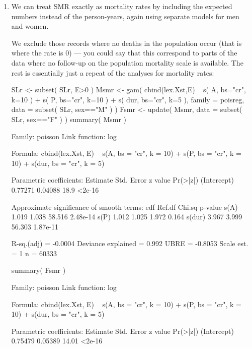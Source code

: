 \begin{enumerate}[resume]

  
  

\item We can treat SMR exactly as mortality rates by including the
  expected numbers instead of the person-years, again using separate
  models for men and women.
 
  We exclude those records where no deaths in the population occur
  (that is where the rate is 0) --- you could say that this correspond
  to parts of the data where no follow-up on the population mortality
  scale is available. The rest is essentially just a repeat of the
  analyses for mortality rates:
\begin{Schunk}
\begin{Sinput}
 SLr <- subset( SLr, E>0 )
 Msmr <- gam( cbind(lex.Xst,E) ~ s(   A, bs="cr", k=10 ) +
                                 s(   P, bs="cr", k=10 ) +
                                 s( dur, bs="cr", k=5 ),
               family = poisreg,
                 data = subset( SLr, sex=="M" ) )
 Fsmr <- update( Msmr, 
                 data = subset( SLr, sex=="F" ) )
 summary( Msmr )
\end{Sinput}
\begin{Soutput}
Family: poisson 
Link function: log 

Formula:
cbind(lex.Xst, E) ~ s(A, bs = "cr", k = 10) + s(P, bs = "cr", 
    k = 10) + s(dur, bs = "cr", k = 5)

Parametric coefficients:
            Estimate Std. Error z value Pr(>|z|)
(Intercept)  0.77271    0.04088    18.9   <2e-16

Approximate significance of smooth terms:
         edf Ref.df Chi.sq  p-value
s(A)   1.019  1.038 58.516 2.48e-14
s(P)   1.012  1.025  1.972    0.164
s(dur) 3.967  3.999 56.303 1.87e-11

R-sq.(adj) =  -0.0004   Deviance explained = 0.992%
UBRE = -0.8053  Scale est. = 1         n = 60333
\end{Soutput}
\begin{Sinput}
 summary( Fsmr )
\end{Sinput}
\begin{Soutput}
Family: poisson 
Link function: log 

Formula:
cbind(lex.Xst, E) ~ s(A, bs = "cr", k = 10) + s(P, bs = "cr", 
    k = 10) + s(dur, bs = "cr", k = 5)

Parametric coefficients:
            Estimate Std. Error z value Pr(>|z|)
(Intercept)  0.75479    0.05389   14.01   <2e-16


\end{Soutput}
\end{Schunk}
\end{enumerate}
